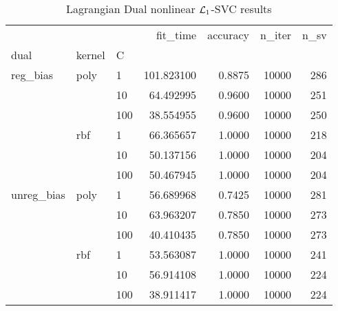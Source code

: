 \begin{table}[H]
\centering
\caption{Lagrangian Dual nonlinear $\protect \mathcal{L}_1$-SVC results}
\label{nonlinear_lagrangian_dual_l1_svc_cv_results}
\begin{tabular}{lllrrrr}
\toprule
           &     &     &    fit\_time &  accuracy &  n\_iter &  n\_sv \\
dual & kernel & C &             &           &         &       \\
\midrule
reg\_bias & poly & 1   &  101.823100 &    0.8875 &   10000 &   286 \\
           &     & 10  &   64.492995 &    0.9600 &   10000 &   251 \\
           &     & 100 &   38.554955 &    0.9600 &   10000 &   250 \\
           & rbf & 1   &   66.365657 &    1.0000 &   10000 &   218 \\
           &     & 10  &   50.137156 &    1.0000 &   10000 &   204 \\
           &     & 100 &   50.467945 &    1.0000 &   10000 &   204 \\
unreg\_bias & poly & 1   &   56.689968 &    0.7425 &   10000 &   281 \\
           &     & 10  &   63.963207 &    0.7850 &   10000 &   273 \\
           &     & 100 &   40.410435 &    0.7850 &   10000 &   273 \\
           & rbf & 1   &   53.563087 &    1.0000 &   10000 &   241 \\
           &     & 10  &   56.914108 &    1.0000 &   10000 &   224 \\
           &     & 100 &   38.911417 &    1.0000 &   10000 &   224 \\
\bottomrule
\end{tabular}
\end{table}
